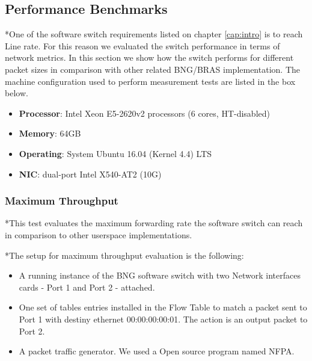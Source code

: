 



\subsection{Performance Benchmarks}

*One of the software switch requirements listed on chapter \ref{cap:intro} is to reach Line rate. For this reason we evaluated the switch performance in terms of network metrics. In this section we show how the switch performs for different packet sizes in comparison with other related BNG/BRAS implementation.   
The machine configuration used to perform measurement tests are listed in the box below. 

\begin{framed}

\begin{itemize}
\item \textbf{Processor}: Intel Xeon E5-2620v2 processors (6 cores, HT-disabled)
\item \textbf{Memory}:	64GB 
\item \textbf{Operating}: System	Ubuntu 16.04 (Kernel 4.4) LTS
\item \textbf{NIC}: dual-port Intel X540-AT2 (10G)

\end{itemize}

\end{framed}

    \subsubsection{Maximum Throughput}
    \label{sec:MaxBand}
    *This test evaluates the maximum forwarding rate the software switch can reach in comparison to other userspace implementations. 
    
    *The setup for maximum throughput evaluation is the following:
    
    \begin{itemize}
    \item A running instance of the BNG software switch with two Network interfaces cards - Port 1 and Port 2 - attached. 
    \item One set of tables entries installed in the Flow Table to match a packet sent to Port 1 with destiny ethernet 00:00:00:00:01. The action is an output packet to Port 2. 
    \item A packet traffic generator. We used a Open source program named NFPA.   
    \end{itemize}
    

